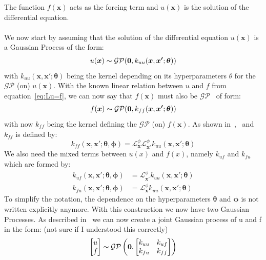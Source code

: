 \documentclass{article}
\begin{document}
The function $f(\bm{x})$ acts as the forcing term and $u(\bm{x})$ is the solution of the differential equation.  \\
\\
We now start by assuming that the solution of the differential equation $u(\bm{x})$ is a Gaussian Process of the form:
\begin{equation}
    u(\bm{x}) \thicksim \mathcal{G}\mathcal{P}(\bm{0},k_{uu}(\bm{x},\bm{x'};\bm{\theta}))
\end{equation}
with $k_{uu}(\bm{x},\bm{x'};\bm{\theta})$ being the kernel depending on its hyperparameters $\theta$ for the $\mathcal{G}\mathcal{P}$ (on) $u(\bm{x})$. With the known linear relation between $u$ and $f$ from equation~\ref{eq:Lu=f}, we can now say that $f(\bm{x})$ must also be $\mathcal{G}\mathcal{P}$~\cite{RasmussenCarlEdward} of form:
\begin{equation}
    f(\bm{x}) \thicksim \mathcal{G}\mathcal{P}(\bm{0},k_{ff}(\bm{x},\bm{x'};\bm{\theta}))
\end{equation}
with now $k_{ff}$ being the kernel defining the $\mathcal{G}\mathcal{P}$ (on) $f(\bm{x})$. As shown in~\cite{garnett_2023_full},~\cite{Särkkä} and~\cite{RAISSI} $k_{ff}$ is defined by:
\begin{equation}
    \label{eq:kff}
    k_{ff}(\bm{x},\bm{x'};\bm{\theta}, \bm{\phi}) = \mathcal{L}_{\bm{x}}^\phi \mathcal{L}_{\bm{x'}}^\phi k_{uu}(\bm{x},\bm{x'};\bm{\theta})
\end{equation}
We also need the mixed terms between $u(x)$ and $f(x)$, namely $k_{uf}$ and $k_{fu}$ which are formed by:
\begin{equation}
    \label{eq:kuf_kfu}
    \begin{aligned}
        k_{uf}(\bm{x,x'};\bm{\theta,\phi}) & = \mathcal{L}_{\bm{x'}}^\phi k_{uu}(\bm{x},\bm{x'};\bm{\theta}) \\
        k_{fu}(\bm{x,x'};\bm{\theta,\phi}) & = \mathcal{L}_{\bm{x}}^\phi k_{uu}(\bm{x},\bm{x'};\bm{\theta})
    \end{aligned}
\end{equation}
To simplify the notation, the dependence on the hyperparameters $\bm{\theta}$ and $\bm{\phi}$ is not written explicitly anymore.
With this construction we now have two Gaussian Processes. As described in~\cite{garnett_2023_full} we can now create a joint Gaussian process of u and f in the form: (not sure if I understood this correctly)
\begin{equation}
    \label{eq:jointGP}
    \begin{aligned}
        \begin{bmatrix}
            u \\
            f
        \end{bmatrix}
    \end{aligned}
    \thicksim \mathcal{GP}\left(\bm{0},
    \begin{bmatrix}
        k_{uu} & k_{uf} \\
        k_{fu} & k_{ff}
    \end{bmatrix}\right)
\end{equation}
\end{document}

